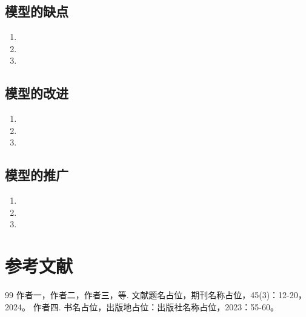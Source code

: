 \documentclass{MathorCupmodeling}
\begin{document}
\subsection{模型的缺点}
\begin{enumerate}[label=\arabic*., wide=0pt, labelsep=0.5em]
	\item %
	\item %
	\item %
\end{enumerate}

\subsection{模型的改进}
\begin{enumerate}[label=\arabic*., wide=0pt, labelsep=0.5em]
	\item %
	\item %
	\item %
\end{enumerate}

\subsection{模型的推广}
\begin{enumerate}[label=\arabic*., wide=0pt, labelsep=0.5em]
	\item %
	\item %
	\item %
\end{enumerate}

\section*{参考文献}
\renewcommand{\refname}{}
\vspace{-2em}
\begin{thebibliography}{99}
\setlength{\itemsep}{0pt}
	作者一，作者二，作者三，等. 文献题名占位，期刊名称占位，45(3)：12-20，2024。
	作者四. 书名占位，出版地占位：出版社名称占位，2023：55-60。
\end{thebibliography}
\end{document}

